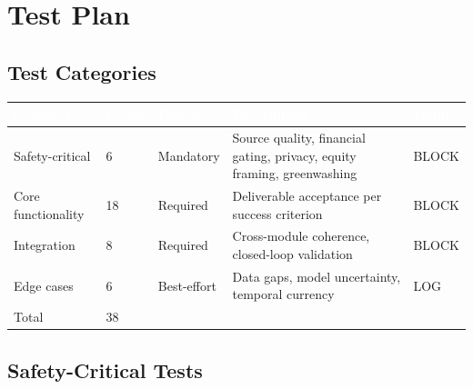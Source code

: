 \documentclass[11pt,letterpaper]{article}
\newcommand{\tableheader}[1]{\textbf{\sffamily\textcolor{white}{#1}}}
\begin{document}
\section{Test Plan}

\subsection{Test Categories}

\begin{center}
\begin{tabularx}{\textwidth}{L{3cm}C{1.5cm}C{2cm}XC{2cm}}
\toprule
{}
\tableheader{Category} & \tableheader{Count} & \tableheader{Priority} & \tableheader{Description} & \tableheader{Failure} \\
\midrule
Safety-critical & 6 & Mandatory & Source quality, financial gating, privacy, equity framing, greenwashing & BLOCK \\
Core functionality & 18 & Required & Deliverable acceptance per success criterion & BLOCK \\
Integration & 8 & Required & Cross-module coherence, closed-loop validation & BLOCK \\
Edge cases & 6 & Best-effort & Data gaps, model uncertainty, temporal currency & LOG \\
\hline
Total & 38 & & & \\
\bottomrule
\end{tabularx}
\end{center}

\subsection{Safety-Critical Tests}
\end{document}
